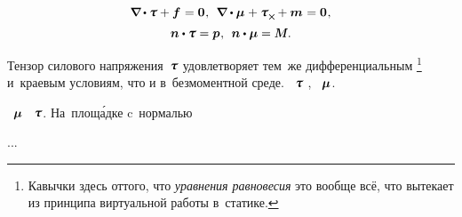 \begin{otherlanguage}{russian}
\nopagebreak\begin{equation}\label{micropolar.equilibrium:cauchy-like}
\boldnabla \hspace{-0.1ex} \dotp \forcestresstensor + \bm{f} \hspace{.12ex} = \bm{0} \hspace{.1ex} ,
\:\:
\boldnabla \dotp \couplestresstensor \hspace{.1ex} + \forcestresstensor_{\Xcompanion} \hspace{-0.1ex} + \bm{m} \hspace{.1ex} = \bm{0} \hspace{.1ex} ,
\end{equation}%
\nopagebreak\vspace{-1em}\begin{equation}\label{micropolar.equilibrium:boundaryconditions}
\bm{n} \dotp \forcestresstensor = \bm{p} \hspace{.1ex} ,
\:\:
\bm{n} \dotp \couplestresstensor = \mathboldM \hspace{.1ex} .
\end{equation}

\vspace{-0.4em} Тензор силового напряжения~$\forcestresstensor$ удовлетворяет тем~же дифференциальным \footnote{Кавычки здесь оттого, что \emph{уравнения равновесия} это вообще всё, что вытекает из принципа виртуальной работы в~статике.} \hspace{-0.5em} и~краевым условиям, что и в~безмоментной среде. ~$\forcestresstensor$ ,  ~$\bm{\mu}$.

 ~$\bm{\mu}$ ~$\forcestresstensor$. На~площ\'{а}дке c~нормалью

...







\end{otherlanguage}
